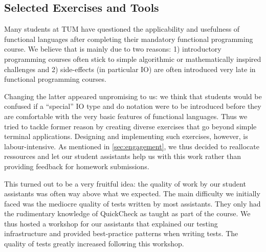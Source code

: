 \subsection{Selected Exercises and Tools}\label{sec:selected_exercises}


Many students at TUM have questioned the
applicability and usefulness
of functional languages after completing
their mandatory functional programming course.
We believe that is mainly due to two reasons:
1) introductory programming courses often stick
to simple algorithmic or mathematically inspired challenges and
2) side-effects (in particular IO)
are often introduced very late
in functional programming courses.

Changing the latter appeared unpromising to us:
we think that students would be confused
if a ``special'' IO type and do notation were to
be introduced before they are comfortable
with the very basic features of functional
languages.
Thus we tried to tackle former reason
by creating diverse exercises that go beyond
simple terminal applications.
Designing and implementing such exercises,
however, is labour-intensive.
As mentioned in \cref{sec:engagement},
we thus decided to reallocate ressources and
let our student assistants help us with this work
rather than providing feedback for homework submissions.

This turned out to be a very fruitful idea:
the quality of work by our student assistants was often way above what
we expected.
The main difficulty we initially faced was the mediocre quality of
tests written by most assistants.
They only had the rudimentary knowledge of QuickCheck as taught as part of
the course.
We thus hosted a workshop for our assistants that explained
our testing infrastructure and provided best-practice
patterns when writing tests.
The quality of tests greatly increased following this workshop.

